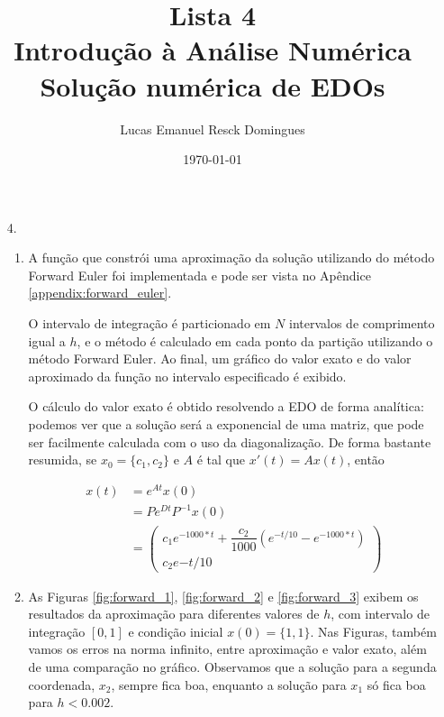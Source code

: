 \documentclass{article}
\title{Lista 4 \\
\large Introdução à Análise Numérica \\
Solução numérica de EDOs}
\author{Lucas Emanuel Resck Domingues}
\date{\today}
\begin{document}
    \maketitle

    \begin{enumerate}
        \item[4.]
            \begin{enumerate}
                \item A função que constrói uma aproximação
                    da solução utilizando do método Forward
                    Euler foi implementada e pode ser vista
                    no Apêndice \ref{appendix:forward_euler}.

                    O intervalo de integração é particionado
                    em $N$ intervalos de comprimento igual a $h$,
                    e o método é calculado em cada ponto da partição
                    utilizando o método Forward Euler. Ao final,
                    um gráfico do valor exato e do valor aproximado
                    da função no intervalo especificado é exibido.

                    O cálculo do valor exato é obtido resolvendo
                    a EDO de forma analítica: podemos ver que a solução
                    será a exponencial de uma matriz, que pode ser
                    facilmente calculada com o uso da diagonalização.
                    De forma bastante resumida, se $x_0 = \{c_1, c_2\}$
                    e $A$ é tal que $x'(t) = A x(t)$, então

                    \begin{align*}
                        x(t) &= e^{At} x(0) \\
                        &= Pe^{Dt}P^{-1} x(0) \\
                        &= \begin{pmatrix}
                            c_1 e^{-1000*t} + \dfrac{c_2}{1000}\left(e^{-t/10} - e^{-1000*t}\right) \\[6pt]
                            c_2 e{-t/10}
                        \end{pmatrix}
                    \end{align*}

                \item As Figuras \ref{fig:forward_1},
                    \ref{fig:forward_2} e \ref{fig:forward_3}
                    exibem os resultados da aproximação para diferentes
                    valores de $h$, com intervalo de integração $[0, 1]$
                    e condição inicial $x(0) = \{1, 1\}$. Nas Figuras,
                    também vamos os erros na norma infinito, entre
                    aproximação e valor exato, além de uma comparação
                    no gráfico. Observamos que a solução para a segunda
                    coordenada, $x_2$, sempre fica boa, enquanto a solução
                    para $x_1$ só fica boa para $h < 0.002$.
                

\end{enumerate}
\end{enumerate}
\end{document}
